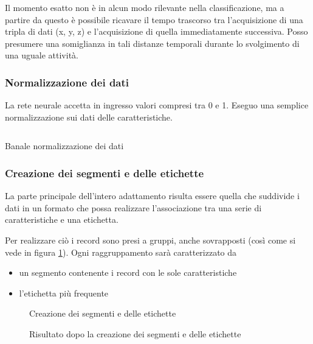 Il momento esatto non è in alcun modo rilevante nella classificazione, ma a partire da questo è possibile ricavare il tempo trascorso 
tra l'acquisizione di una tripla di dati (x, y, z) e l'acquisizione di quella immediatamente successiva.
Posso presumere una somiglianza in tali distanze temporali durante lo svolgimento di una uguale attività.

\subsubsection{Normalizzazione dei dati}
La rete neurale accetta in ingresso valori compresi tra 0 e 1. Eseguo una semplice normalizzazione sui dati delle caratteristiche.
\begin{listing}[H] 
    \inputminted[frame=single,framesep=10pt]{python}{assets/snippets/classifier/normalize_data.py}
    \caption{Banale normalizzazione dei dati}
\end{listing}

\subsubsection{Creazione dei segmenti e delle etichette}
La parte principale dell'intero adattamento risulta essere quella che suddivide i dati in un formato che possa 
realizzare l'associazione tra una serie di caratteristiche e una etichetta.

Per realizzare ciò i record sono presi a gruppi, anche sovrapposti (così come si vede in figura \ref{fig:create_segments_and_labels}). 
Ogni raggruppamento sarà caratterizzato da 
\begin{itemize}
    \item un segmento contenente i record con le sole caratteristiche
    \item l'etichetta più frequente
\end{itemize}

\begin{figure}[H]
  \centering
  
  \caption{Creazione dei segmenti e delle etichette}
  \label{fig:create_segments_and_labels}
\end{figure}

\begin{figure}[H]
  \centering
  
  \caption{Risultato dopo la creazione dei segmenti e delle etichette}
  \label{fig:segments_and_labels}
\end{figure}

